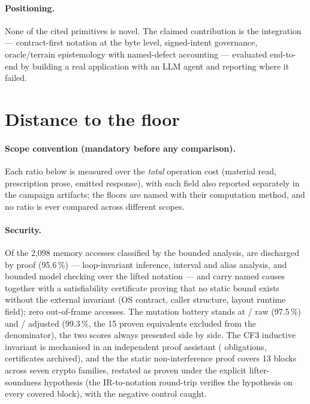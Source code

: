 \documentclass[11pt,a4paper]{article}
\begin{document}
\paragraph{Positioning.} None of the cited primitives is novel. The
claimed contribution is the integration --- contract-first notation at
the byte level, signed-intent governance, oracle/terrain epistemology
with named-defect accounting --- evaluated end-to-end by building a real
application with an LLM agent and reporting where it failed.

\section{Distance to the floor}\label{sec:floor}
\paragraph{Scope convention (mandatory before any comparison).}
Each ratio below is measured over the \emph{total} operation cost
(material read, prescription prose, emitted response), with each field
also reported separately in the campaign artifacts; the floors are
named with their computation method, and no ratio is ever compared
across different scopes.

\paragraph{Security.} Of the 2{,}098 memory accesses classified by the
bounded analysis, \sureteDecharges{} are discharged by proof (95.6\,\%)
--- loop-invariant inference, interval and alias analysis, and bounded
model checking over the lifted notation --- and \sureteNOMMES{} carry
named causes together with a satisfiability certificate proving that no
static bound exists without the external invariant (OS contract, caller
structure, layout runtime field); zero out-of-frame accesses. The
mutation battery stands at \mutationBrutNum/\mutationDenomBrut{} raw
(97.5\,\%) and \mutationAjusteNum/\mutationDenomAjuste{} adjusted
(99.3\,\%, the 15 proven equivalents excluded from the denominator),
the two scores always presented side by side. The CF3 inductive
invariant is mechanised in an independent proof assistant
(\cfTroisObligations{} obligations, certificates archived), and the
the static non-interference proof covers 13 blocks across seven
crypto families, restated as proven under the explicit lifter-
soundness hypothesis (the IR-to-notation round-trip verifies the
hypothesis on every covered block), with the negative control
caught.
\end{document}
